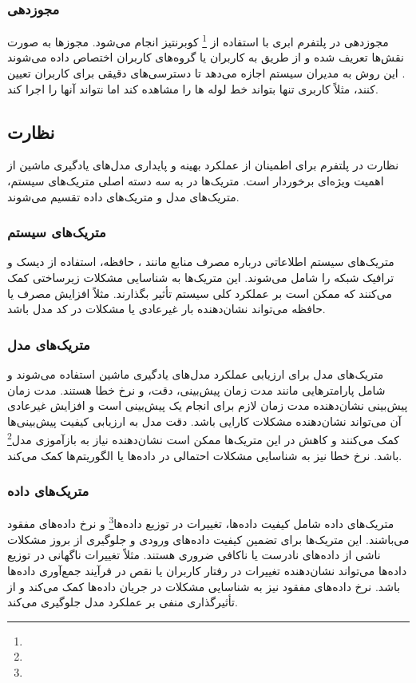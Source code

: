 \subsubsection{مجوزدهی}
مجوزدهی در پلتفرم ابری با استفاده از \footnote{} کوبرنتیز انجام می‌شود. مجوزها به صورت نقش‌ها تعریف شده و از طریق  به کاربران یا گروه‌های کاربران اختصاص داده می‌شوند \cite{Kubernetes1}. این روش به مدیران سیستم اجازه می‌دهد تا دسترسی‌های دقیقی برای کاربران تعیین کنند، مثلاً کاربری تنها بتواند خط لوله ها را مشاهده کند اما نتواند آنها را اجرا کند.

\subsection{نظارت}
نظارت در پلتفرم  برای اطمینان از عملکرد بهینه و پایداری مدل‌های یادگیری ماشین از اهمیت ویژه‌ای برخوردار است. متریک‌ها در  به سه دسته اصلی متریک‌های سیستم، متریک‌های مدل و متریک‌های داده تقسیم می‌شوند.

\subsubsection{متریک‌های سیستم}
متریک‌های سیستم اطلاعاتی درباره مصرف منابع مانند ، حافظه، استفاده از دیسک و ترافیک شبکه را شامل می‌شوند. این متریک‌ها به شناسایی مشکلات زیرساختی کمک می‌کنند که ممکن است بر عملکرد کلی سیستم تأثیر بگذارند. مثلاً افزایش مصرف  یا حافظه می‌تواند نشان‌دهنده بار غیرعادی یا مشکلات در کد مدل باشد.

\subsubsection{متریک‌های مدل}
متریک‌های مدل برای ارزیابی عملکرد مدل‌های یادگیری ماشین استفاده می‌شوند و شامل پارامترهایی مانند مدت زمان پیش‌بینی، دقت،  و نرخ خطا هستند. مدت زمان پیش‌بینی نشان‌دهنده مدت زمان لازم برای انجام یک پیش‌بینی است و افزایش غیرعادی آن می‌تواند نشان‌دهنده مشکلات کارایی باشد. دقت مدل به ارزیابی کیفیت پیش‌بینی‌ها کمک می‌کنند و کاهش در این متریک‌ها ممکن است نشان‌دهنده نیاز به بازآموزی مدل\footnote{} باشد. نرخ خطا نیز به شناسایی مشکلات احتمالی در داده‌ها یا الگوریتم‌ها کمک می‌کند.

\subsubsection{متریک‌های داده}
متریک‌های داده شامل کیفیت داده‌ها، تغییرات در توزیع داده‌ها\footnote{} و نرخ داده‌های مفقود می‌باشند. این متریک‌ها برای تضمین کیفیت داده‌های ورودی و جلوگیری از بروز مشکلات ناشی از داده‌های نادرست یا ناکافی ضروری هستند. مثلاً تغییرات ناگهانی در توزیع داده‌ها می‌تواند نشان‌دهنده تغییرات در رفتار کاربران یا نقص در فرآیند جمع‌آوری داده‌ها باشد. نرخ داده‌های مفقود نیز به شناسایی مشکلات در جریان داده‌ها کمک می‌کند و از تأثیرگذاری منفی بر عملکرد مدل جلوگیری می‌کند.


